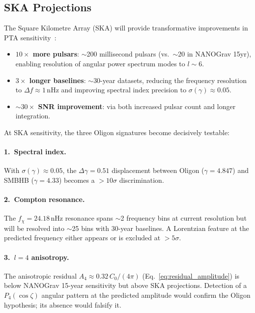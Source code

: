 \subsection{SKA Projections}

The Square Kilometre Array (SKA) will provide transformative improvements in PTA sensitivity~\cite{Taylor2022}:
\begin{itemize}
    \item \textbf{$10\times$ more pulsars}: $\sim$200 millisecond pulsars (vs.~$\sim$20 in NANOGrav 15yr), enabling resolution of angular power spectrum modes to $l \sim 6$.
    \item \textbf{$3\times$ longer baselines}: $\sim$30-year datasets, reducing the frequency resolution to $\Delta f \approx 1\,$nHz and improving spectral index precision to $\sigma(\gamma) \approx 0.05$.
    \item \textbf{$\sim\!30\times$ SNR improvement}: via both increased pulsar count and longer integration.
\end{itemize}

At SKA sensitivity, the three Oligon signatures become decisively testable:

\paragraph{1.~Spectral index.}
With $\sigma(\gamma) \approx 0.05$, the $\Delta\gamma = 0.51$ displacement between Oligon ($\gamma = 4.847$) and SMBHB ($\gamma = 4.33$) becomes a $>10\sigma$ discrimination.

\paragraph{2.~Compton resonance.}
The $f_\chi = 24.18\,$nHz resonance spans $\sim$2 frequency bins at current resolution but will be resolved into $\sim$25 bins with 30-year baselines.  A Lorentzian feature at the predicted frequency either appears or is excluded at $>5\sigma$.

\paragraph{3.~$l=4$ anisotropy.}
The anisotropic residual $A_4 \approx 0.32\, C_0/(4\pi)$ (Eq.~\ref{eq:residual_amplitude}) is below NANOGrav 15-year sensitivity but above SKA projections.  Detection of a $P_4(\cos\zeta)$ angular pattern at the predicted amplitude would confirm the Oligon hypothesis; its absence would falsify it.


